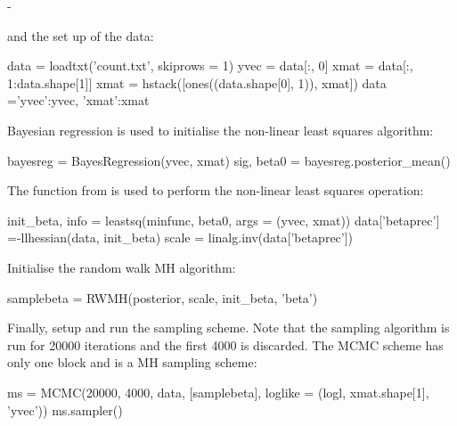 -\documentclass[article]{jss}
\begin{document}
and the set up of the data:
\begin{Code}
data = loadtxt('count.txt', skiprows = 1)
yvec = data[:, 0]
xmat = data[:, 1:data.shape[1]]
xmat = hstack([ones((data.shape[0], 1)), xmat])
data ={'yvec':yvec, 'xmat':xmat} 
\end{Code}

Bayesian regression is used to initialise the non-linear least squares
algorithm:
\begin{Code}
bayesreg = BayesRegression(yvec, xmat)
sig, beta0 = bayesreg.posterior_mean()
\end{Code}

The function  from  is used to perform the
non-linear least squares operation:

\begin{Code}
init_beta, info = leastsq(minfunc, beta0, args = (yvec, xmat))
data['betaprec'] =-llhessian(data, init_beta)
scale = linalg.inv(data['betaprec'])
\end{Code}

Initialise the random walk MH algorithm:
\begin{Code}
samplebeta = RWMH(posterior, scale, init_beta, 'beta')
\end{Code}

Finally, setup and run the sampling scheme.  Note that the sampling
algorithm is run for 20000 iterations and the first 4000 is
discarded. The MCMC scheme has only one block and is a MH sampling
scheme:

\begin{Code}
ms = MCMC(20000, 4000, data, [samplebeta], 
      loglike = (logl, xmat.shape[1], 'yvec'))
ms.sampler()
\end{Code}






\end{document}
